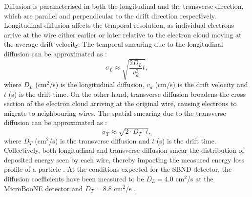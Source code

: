 Diffusion is parameterised in both the longitudinal and the transverse direction, which are parallel and perpendicular to the drift direction respectively.
Longitudinal diffusion affects the temporal resolution, as individual electrons arrive at the wire either earlier or later relative to the electron cloud moving at the average drift velocity.
The temporal smearing due to the longitudinal diffusion can be approximated as \cite{uboone_diff}:
\begin{equation}
        \sigma_{L} \approx \sqrt{\frac{2D_L}{v^{2}_{d}}t},
\end{equation}
where $D_L$ (cm$^2$/s) is the longitudinal diffusion, $v_{d}$ (cm/s) is the drift velocity and $t$ (s) is the drift time.
On the other hand, transverse diffusion broadens the cross section of the electron cloud arriving at the original wire, causing electrons to migrate to neighbouring wires.
The spatial smearing due to the transverse diffusion can be approximated as \cite{GrayDiffusion}:
\begin{equation}
        \sigma_T \approx \sqrt{2 \cdot D_T \cdot t},
\end{equation}
where $D_T$ (cm$^2$/s) is the transverse diffusion and $t$ (s) is the drift time.
Collectively, both longitudinal and transverse diffusion smear the distribution of deposited energy seen by each wire, thereby impacting the measured energy loss profile of a particle \cite{GrayDiffusion}.
At the conditions expected for the SBND detector, the diffusion coefficients have been measured to be $D_{L} = 4.0 $ cm$^{2}$/s at the MicroBooNE detector \cite{uboone_diff} and $D_T = 8.8 $ cm$^{2}$/s \cite{protodune}.

